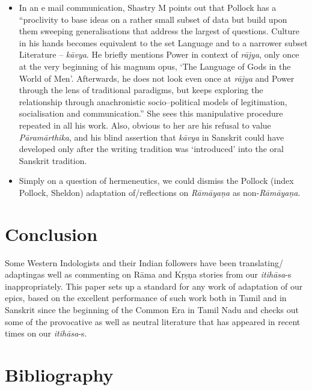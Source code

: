 \begin{itemize}
 \item In an e mail communication, Shastry M points out that Pollock has a “proclivity to base ideas on a rather small subset of data but build upon them sweeping generalisations that address the largest of questions. Culture in his hands becomes equivalent to the set Language and to a narrower subset Literature – \textit{kāvya}. He briefly mentions Power in context of \textit{rājya}, only once at the very beginning of his magnum opus, ‘The Language of Gods in the World of Men’. Afterwards, he does not look even once at \textit{rājya} and Power through the lens of traditional paradigms, but keeps exploring the relationship through anachronistic socio–political models of legitimation, socialisation and communication.” She sees this manipulative procedure repeated in all his work. Also, obvious to her are his refusal to value \textit{Pāramārthika}, and his blind assertion that \textit{kāvya} in Sanskrit could have developed only after the writing tradition was ‘introduced’ into the oral Sanskrit tradition.

 \item Simply on a question of hermeneutics, we could dismiss the Pollock (index Pollock, Sheldon) adaptation of/reflections on \textit{Rāmāyaṇa} as non-\textit{Rāmāyaṇa}.

\end{itemize}



\section*{Conclusion}

Some Western Indologists and their Indian followers have been translating/ adaptingas well as commenting on Rāma and Kṛṣņa stories from our \textit{itihāsa}-s inappropriately. This paper sets up a standard for any work of adaptation of our epics, based on the excellent performance of such work both in Tamil and in Sanskrit since the beginning of the Common Era in Tamil Nadu and checks out some of the provocative as well as neutral literature that has appeared in recent times on our \textit{itihāsa}-s.


\section*{Bibliography}

